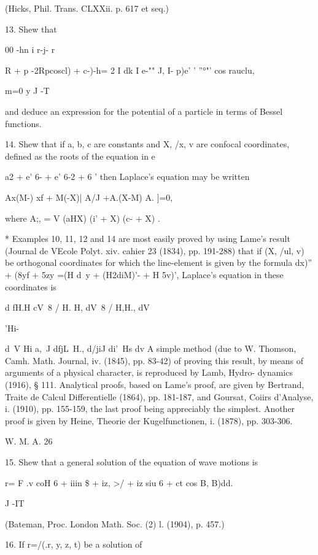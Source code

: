 (Hicks, Phil. Trans. CLXXii. p. 617 et seq.)

13. Shew that

00 -hn i r-j- r

 R + p -2Rpcoscl) + c-)-h= 2 I dk I e-"" J, I- p)e' ' ''°"' cos
rauclu,

m=0 y J -T

and deduce an expression for the potential of a particle in terms of
Bessel functions.

14. Shew that if a, b, c are constants and X, /x, v are confocal
coordinates, defined as the roots of the equation in e

a2 + e' 6- + e' 6-2 + 6 ' then Laplace's equation may be written

Ax(M-) xf + M(-X)| A/J +A.(X-M) A. ]=0,

where A;, = V (aHX) (i' + X) (c- + X) .


* Examples 10, 11, 12 and 14 are most easily proved by using Lame's
result (Journal de VEcole Polyt. xiv. cahier 23 (1834), pp. 191-288)
that if (X, /ul, v) be orthogonal coordinates for which the
line-element is given by the formula dx)'' + (8yf + 5zy =(H d\ y +
(H2diM)'- + H 5v)', Laplace's equation in these coordinates is

d fH.H cV\ 8 / H. H, dV\ 8 / H,H., dV\ \

'Hi-

d\ V Hi a,\ J dfjL\ H., d/jiJ di'\ Hs dv A simple method (due to W.
Thomson, Camh. Math. Journal, iv. (1845), pp. 83-42) of proving this
result, by means of arguments of a physical character, is reproduced
by Lamb, Hydro- dynamics (1916), § 111. Analytical proofs, based on
Lame's proof, are given by Bertrand, Traite de Calcul Differentielle
(1864), pp. 181-187, and Goursat, Coiirs d'Analyse, i. (1910), pp.
155-159, the last proof being appreciably the simplest. Another proof
is given by Heine, Theorie der Kugelfunctionen, i. (1878), pp.
303-306.

W. M. A. 26

%
%

15. Shew that a general solution of the equation of wave motions is

r= F .v coH 6 + iiin \$ + iz, >/ + iz siu 6 + ct cos B, B)dd.

J -IT

(Bateman, Proc. London Math. Soc. (2) l. (1904), p. 457.)

16. If r=/(.r, y, z, t) be a solution of

